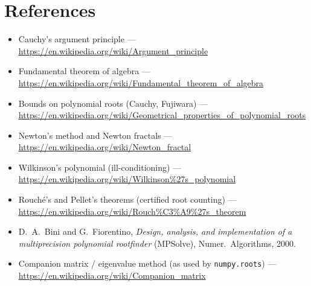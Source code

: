 \documentclass[11pt]{article}
\begin{document}
\section{References}
\begin{itemize}
  \item Cauchy's argument principle ---
    \url{https://en.wikipedia.org/wiki/Argument_principle}
  \item Fundamental theorem of algebra ---
    \url{https://en.wikipedia.org/wiki/Fundamental_theorem_of_algebra}
  \item Bounds on polynomial roots (Cauchy, Fujiwara) ---
    \url{https://en.wikipedia.org/wiki/Geometrical_properties_of_polynomial_roots}
  \item Newton's method and Newton fractals ---
    \url{https://en.wikipedia.org/wiki/Newton_fractal}
  \item Wilkinson's polynomial (ill-conditioning) ---
    \url{https://en.wikipedia.org/wiki/Wilkinson\%27s_polynomial}
  \item Rouch\'e's and Pellet's theorems (certified root counting) ---
    \url{https://en.wikipedia.org/wiki/Rouch\%C3\%A9\%27s_theorem}
  \item D.~A.~Bini and G.~Fiorentino, \emph{Design, analysis, and implementation
    of a multiprecision polynomial rootfinder} (MPSolve), Numer.\ Algorithms,
    2000.
  \item Companion matrix / eigenvalue method (as used by
    \texttt{numpy.roots}) ---
    \url{https://en.wikipedia.org/wiki/Companion_matrix}
\end{itemize}
\end{document}
